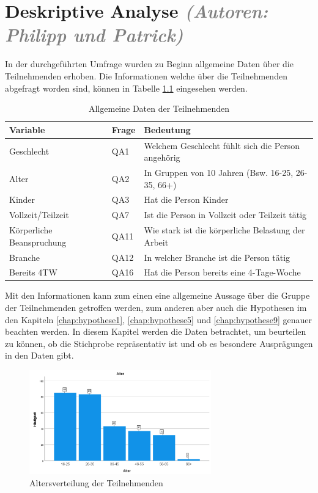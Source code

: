 \chapter{Deskriptive Analyse \textit{\textcolor{gray}{(Autoren: Philipp und Patrick)}}}

In der durchgeführten Umfrage wurden zu Beginn allgemeine Daten über die Teilnehmenden erhoben.
Die Informationen welche über die Teilnehmenden abgefragt worden sind, können in Tabelle
\ref{tab:allgemeine_daten} eingesehen werden.

\begin{table}[h]
    \centering
    \begin{tabular}{|l|l|p{8cm}|}
        \hline
        \textbf{Variable} & \textbf{Frage} & \textbf{Bedeutung}\\
        \hline
        Geschlecht & QA1 & Welchem Geschlecht fühlt sich die Person angehörig\\\hline
        Alter & QA2 & In Gruppen von 10 Jahren (Bsw. 16-25, 26-35, 66+)\\\hline
        Kinder & QA3 & Hat die Person Kinder\\\hline
        Vollzeit/Teilzeit & QA7 & Ist die Person in Vollzeit oder Teilzeit tätig\\\hline
        Körperliche Beanspruchung & QA11 & Wie stark ist die körperliche Belastung der Arbeit\\\hline
        Branche & QA12 & In welcher Branche ist die Person tätig\\\hline
        Bereits 4TW & QA16 & Hat die Person bereits eine 4-Tage-Woche\\\hline
    \end{tabular}
    \caption{Allgemeine Daten der Teilnehmenden}
    \label{tab:allgemeine_daten}
\end{table}

Mit den Informationen kann zum einen eine allgemeine Aussage über die Gruppe der Teilnehmenden 
getroffen werden, zum anderen aber auch die Hypothesen im den Kapiteln \ref{chap:hypothese1},
\ref{chap:hypothese5} und \ref{chap:hypothese9} genauer beachten werden. In diesem 
Kapitel werden die Daten betrachtet, um beurteilen zu können, ob die Stichprobe repräsentativ ist 
und ob es besondere Ausprägungen in den Daten gibt.

\begin{figure}[h]
    \centering
    \includegraphics[width=0.7\textwidth]{04_Artefakte/01_Abbildungen/deskriptiv_alter.png}
    \caption{Altersverteilung der Teilnehmenden}
    \label{fig:altersverteilung}
\end{figure}

